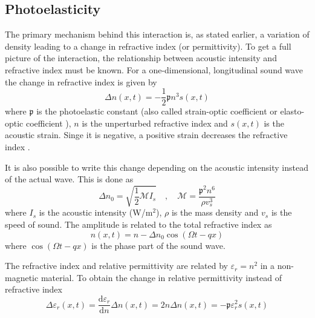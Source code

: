 \documentclass[10pt,a4paper,draft]{scrartcl}
\begin{document}
	\subsection{Photoelasticity}
	The primary mechanism behind this interaction is, as stated earlier, a variation of density leading to a change in refractive index (or permittivity). To get a full picture of the interaction, the relationship between acoustic intensity and refractive index must be known. For a one-dimensional, longitudinal sound wave the change in refractive index is given by \cite{Saleh2007}
	\begin{equation*}
	\Delta n (x,t) = -\frac{1}{2} \mathfrak{p} n^3 s(x,t)
	\end{equation*}
	where $\mathfrak{p}$ is the photoelastic constant (also called strain-optic coefficient or elasto-optic coefficient \cite{Korpel1988}), $n$ is the unperturbed refractive index and $s(x,t)$ is the acoustic strain. Singe it is negative, a positive strain decreases the refractive index \cite{Saleh2007}.
	
	It is also possible to write this change depending on the acoustic intensity instead of the actual wave. This is done as \cite{Saleh2007}
	\begin{equation*}
	\Delta n_0 = \sqrt{\frac{1}{2} \mathcal{M} I_s} \quad , \quad
	\mathcal{M} = \frac{\mathfrak{p}^2 n^6}{\rho v_s^3}
	\end{equation*}
	where $I_s$ is the acoustic intensity (W/m$^2$), $\rho$ is the mass density and $v_s$ is the speed of sound. The amplitude is related to the total refractive index as \cite{Saleh2007}
	\begin{equation*}
	n(x,t) = n - \Delta n_0 \cos(\Omega t - qx)
	\end{equation*}
	where $\cos(\Omega t - qx)$ is the phase part of the sound wave. 
	
	The refractive index and relative permittivity are related by $\varepsilon_r = n^2$ in a non-magnetic material. To obtain the change in relative permittivity instead of refractive index
	\begin{equation*}
	\Delta \varepsilon_r(x,t) = \frac{\mathrm{d}\varepsilon_r}{\mathrm{d}n} \Delta n(x,t) = 2n \Delta n(x,t) = -\mathfrak{p} \varepsilon_r^2 s(x,t)
	\end{equation*}
	
\end{document}
